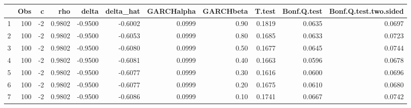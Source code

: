 \begin{table}[ht]
\centering
\begin{tabular}{rrrrrrrrrrr}
  \hline
 & Obs & c & rho & delta & delta\_hat & GARCHalpha & GARCHbeta & T.test & Bonf.Q.test & Bonf.Q.test.two.sided \\ 
  \hline
1 & 100 & -2 & 0.9802 & -0.9500 & -0.6002 & 0.0999 & 0.90 & 0.1819 & 0.0635 & 0.0697 \\ 
  2 & 100 & -2 & 0.9802 & -0.9500 & -0.6053 & 0.0999 & 0.80 & 0.1685 & 0.0633 & 0.0723 \\ 
  3 & 100 & -2 & 0.9802 & -0.9500 & -0.6080 & 0.0999 & 0.50 & 0.1677 & 0.0645 & 0.0744 \\ 
  4 & 100 & -2 & 0.9802 & -0.9500 & -0.6081 & 0.0999 & 0.40 & 0.1663 & 0.0596 & 0.0678 \\ 
  5 & 100 & -2 & 0.9802 & -0.9500 & -0.6077 & 0.0999 & 0.30 & 0.1616 & 0.0600 & 0.0696 \\ 
  6 & 100 & -2 & 0.9802 & -0.9500 & -0.6077 & 0.0999 & 0.20 & 0.1675 & 0.0610 & 0.0680 \\ 
  7 & 100 & -2 & 0.9802 & -0.9500 & -0.6086 & 0.0999 & 0.10 & 0.1741 & 0.0667 & 0.0742 \\ 
   \hline
\end{tabular}
\end{table}
